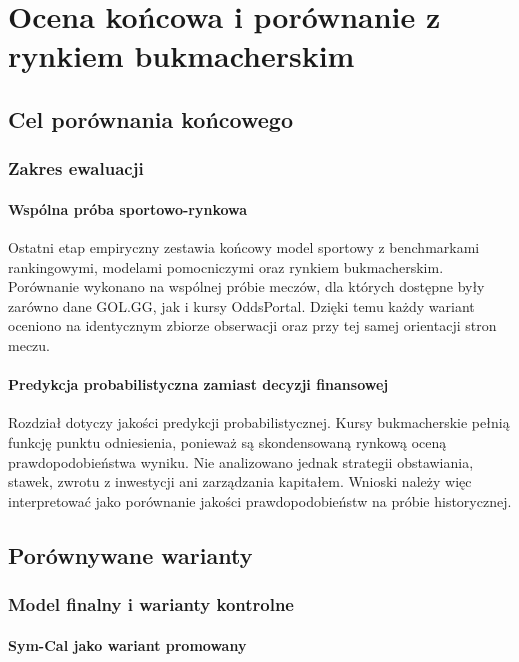 \chapter{Ocena końcowa i porównanie z rynkiem bukmacherskim}

\section{Cel porównania końcowego}

\subsection{Zakres ewaluacji}

\subsubsection{Wspólna próba sportowo-rynkowa}

Ostatni etap empiryczny zestawia końcowy model sportowy z benchmarkami rankingowymi, modelami
pomocniczymi oraz rynkiem bukmacherskim. Porównanie wykonano na wspólnej próbie meczów, dla których
dostępne były zarówno dane GOL.GG, jak i kursy OddsPortal. Dzięki temu każdy wariant oceniono na
identycznym zbiorze obserwacji oraz przy tej samej orientacji stron meczu.

\subsubsection{Predykcja probabilistyczna zamiast decyzji finansowej}

Rozdział dotyczy jakości predykcji probabilistycznej. Kursy bukmacherskie pełnią funkcję punktu
odniesienia, ponieważ są skondensowaną rynkową oceną prawdopodobieństwa wyniku. Nie analizowano
jednak strategii obstawiania, stawek, zwrotu z inwestycji ani zarządzania kapitałem. Wnioski należy
więc interpretować jako porównanie jakości prawdopodobieństw na próbie historycznej.

\section{Porównywane warianty}

\subsection{Model finalny i warianty kontrolne}

\subsubsection{Sym-Cal jako wariant promowany}

